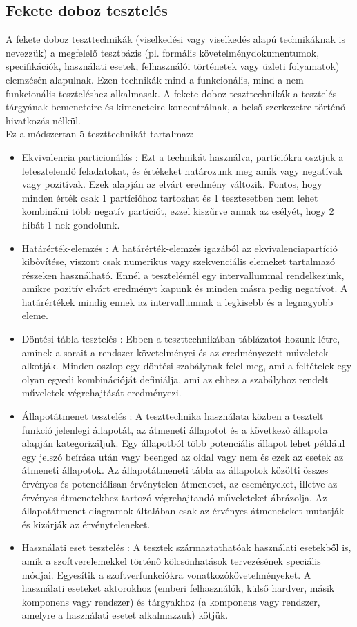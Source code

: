 \subsection{Fekete doboz tesztelés} A fekete doboz teszttechnikák (viselkedési vagy viselkedés alapú technikáknak is nevezzük) a megfelelő
tesztbázis (pl. formális követelménydokumentumok, specifikációk, használati esetek, felhasználói történetek
vagy üzleti folyamatok) elemzésén alapulnak. Ezen technikák mind a funkcionális, mind a nem funkcionális
teszteléshez alkalmasak. A fekete doboz teszttechnikák a tesztelés tárgyának bemeneteire és kimeneteire
koncentrálnak, a belső szerkezetre történő hivatkozás nélkül.\\
Ez a módszertan 5 teszttechnikát tartalmaz:
\begin{itemize}
\item Ekvivalencia particionálás : Ezt a technikát használva, partíciókra osztjuk a letesztelendő feladatokat, és értékeket határozunk meg amik vagy negatívak vagy pozitívak. Ezek alapján az elvárt eredmény változik. Fontos, hogy minden érték csak 1 partícióhoz tartozhat és 1 tesztesetben nem lehet kombinálni több negatív partíciót, ezzel kiszűrve annak az esélyét, hogy 2 hibát 1-nek gondolunk.
\item Határérték-elemzés : A határérték-elemzés igazából az ekvivalenciapartíció kibővítése, viszont csak numerikus vagy szekvenciális elemeket tartalmazó részeken használható. Ennél a tesztelésnél egy intervallummal rendelkezünk, amikre pozitív elvárt eredményt kapunk és minden másra pedig negatívot. A határértékek mindig ennek az intervallumnak a legkisebb és a legnagyobb eleme.
\item Döntési tábla tesztelés : Ebben a teszttechnikában táblázatot hozunk létre, aminek a sorait a rendszer követelményei és az eredményezett műveletek alkotják. Minden oszlop egy döntési szabálynak felel meg, ami a feltételek egy olyan egyedi kombinációját definiálja, ami az ehhez a szabályhoz rendelt műveletek végrehajtását eredményezi.
\item Állapotátmenet tesztelés : A teszttechnika használata közben a tesztelt funkció jelenlegi állapotát, az átmeneti állapotot és a következő állapota alapján kategorizáljuk. Egy állapotból több potenciális állapot lehet például egy jelszó beírása után vagy beenged az oldal vagy nem és ezek az esetek az átmeneti állapotok. Az állapotátmeneti tábla az állapotok közötti összes érvényes és potenciálisan érvénytelen átmenetet, az eseményeket, illetve az érvényes átmenetekhez tartozó végrehajtandó műveleteket ábrázolja. Az állapotátmenet diagramok általában csak az érvényes átmeneteket mutatják és kizárják az érvényteleneket.
\item Használati eset tesztelés : A tesztek származtathatóak használati esetekből is, amik a szoftverelemekkel történő kölcsönhatások tervezésének speciális módjai. Egyesítik a szoftverfunkciókra vonatkozókövetelményeket. A használati eseteket aktorokhoz (emberi felhasználók, külső hardver, másik komponens vagy rendszer) és tárgyakhoz (a komponens vagy rendszer, amelyre a használati esetet alkalmazzuk) kötjük.
\end{itemize}\cite{syllabus2}

